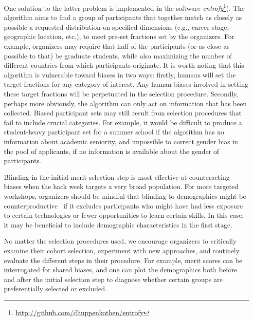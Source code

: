 One solution to the latter problem is implemented in the software \textit{entrofy}\footnote{\url{http://github.com/dhuppenkothen/entrofy}}). 
The algorithm aims to find a group of participants that together match as closely as possible a requested distribution on specified dimensions (e.g., career stage, geographic location, etc.), to meet pre-set fractions set by the organizers.
For example, organizers may require that half of the participants (or as close as possible to that) be graduate students, while also maximizing the number of different countries from which participants originate. 
It is worth noting that this algorithm is vulnerable toward biases in two ways: firstly, humans will set the target fractions for any category of interest.  
Any human biases involved in setting these target fractions will be perpetuated in the selection procedure. 
Secondly, perhaps more obviously, the algorithm can only act on information that has been collected.
Biased participant sets may still result from selection procedures that fail to include crucial categories. For example, it would be difficult to produce a student-heavy participant set for a summer school if the algorithm has no information about academic seniority, and impossible to correct gender bias in the pool of applicants, if no information is available about the gender of participants.

Blinding in the initial merit selection step is most effective at counteracting biases when the hack week targets a very broad population. 
For more targeted workshops, organizers should be mindful that blinding to demographics might be counterproductive~\cite{behaghel2015unintended} if it excludes participants who might have had less exposure to certain technologies or fewer opportunities to learn certain skills. 
In this case, it may be beneficial to include demographic characteristics in the first stage. 

No matter the selection procedures used, we encourage organizers to critically examine their cohort selection, experiment with new approaches, and routinely evaluate the different steps in their procedure.  For example, merit scores can be interrogated for shared biases, and one can plot the demographics both before and after the initial selection step to diagnose whether certain groups are preferentially selected or excluded. 



